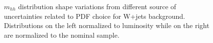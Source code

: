 \begin{figure}[!htbp]
\begin{center}
\caption{$m_{hh}$ distribution shape variations from different source of uncertainties related 
to PDF choice for W+jets background. Distributions on the left normalized to luminosity while on 
the right are normalized to the nominal sample.}
\label{fig:boosted_systematics_wjets_sr_pdf}
\end{center}
\end{figure}


